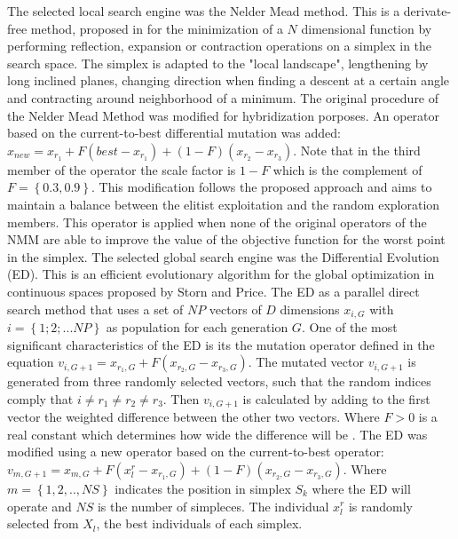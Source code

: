 \documentclass[a4paper,12pt]{article}
\begin{document}
The selected local search engine was the Nelder Mead method. This is a derivate-free method, proposed in \cite{nelder_simplex_1965} for the minimization of a $ N $ dimensional function by performing reflection, expansion or contraction operations on a simplex in the search space. The simplex is adapted to the "local landscape", lengthening by long inclined planes, changing direction when finding a descent at a certain angle and contracting around neighborhood of a minimum. The original procedure of the Nelder Mead Method was modified for hybridization porposes. An operator based on the current-to-best differential mutation was added:  $ x_ {new} = x_ {r_1} + F (best-x_ {r_1}) + (1-F) (x_ {r_2} -x_ {r_3 }) $. Note that in the third member of the operator the scale factor is $ 1-F $ which is the complement of  $ F=\left\lbrace 0.3,0.9\right\rbrace $. This modification follows the proposed approach and aims to maintain a balance between the elitist exploitation and the random exploration members. This operator is applied when none of the original operators of the NMM are able to improve the value of the objective function for the worst point in the simplex. The selected global search engine was the Differential Evolution (ED). This is an efficient evolutionary algorithm for the global optimization in continuous spaces proposed by Storn and Price. The ED as a parallel direct search method that uses a set of $ NP $ vectors of $ D $ dimensions $ x_ {i, G} $ with $ i = \left \lbrace 1; 2; ... NP \right \rbrace $ as population for each generation $ G $. One of the most significant characteristics of the ED is its the mutation operator defined in the equation $ v_ {i, G + 1} = x_ {r_1, G} + F (x_ {r_2, G} -x_ {r_3, G} ) $. The mutated vector $ v_{i, G + 1} $ is generated from three randomly selected vectors, such that the random indices comply that $ i \neq r_1 \neq r_2 \neq r_3 $. Then $ v_ {i, G + 1} $ is calculated by adding  to the first vector the weighted difference between the other two vectors. Where $ F> 0 $ is a real constant which determines how wide the difference will be \cite{stornprice1995}. The ED was modified using a new operator based on the current-to-best operator: $ v_ {m, G + 1} = x_ {m, G} + F (x ^ r_l-x_ {r_1, G}) + (1-F) (x_ {r_2, G} -x_ {r_3, G}) $. Where $ m = \left \lbrace 1,2, .., NS \right \rbrace $ indicates the position in simplex $ S_k $ where the ED will operate and $ NS $ is the number of simpleces. The individual $ x ^ r_l $ is randomly selected from $ X_l $, the best individuals of each simplex.
\end{document}
